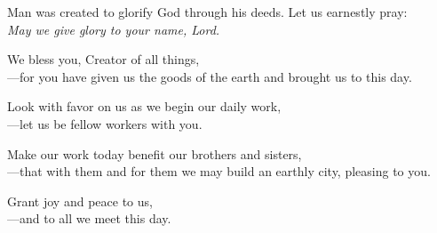 \intercessions

\begin{raggedright}
Man was created to glorify God through his deeds. Let us earnestly pray:\\
\emph{May we give glory to your name, Lord.}

\medskip
We bless you, Creator of all things,\\
{\color{red}---}for you have given us the goods of the earth and brought us to this day.

\medskip
Look with favor on us as we begin our daily work,\\
{\color{red}---}let us be fellow workers with you.

\medskip
Make our work today benefit our brothers and sisters,\\
{\color{red}---}that with them and for them we may build an earthly city, pleasing to you.

\medskip
Grant joy and peace to us,\\
{\color{red}---}and to all we meet this day.
\end{raggedright}